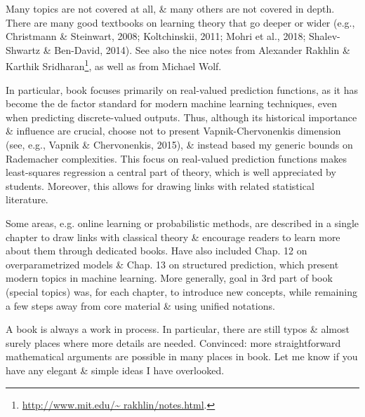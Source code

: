 \documentclass{article}
\begin{document}
\begin{enumerate}
	Many topics are not covered at all, \& many others are not covered in depth. There are many good textbooks on learning theory that go deeper or wider (e.g., Christmann \& Steinwart, 2008; Koltchinskii, 2011; Mohri et al., 2018; Shalev-Shwartz \& Ben-David, 2014). See also the nice notes from Alexander Rakhlin \& Karthik Sridharan\footnote{\url{http://www.mit.edu/~ rakhlin/notes.html}.}, as well as from Michael Wolf.
	
	In particular, book focuses primarily on real-valued prediction functions, as it has become the de factor standard for modern machine learning techniques, even when predicting discrete-valued outputs. Thus, although its historical importance \& influence are crucial, choose not to present Vapnik-Chervonenkis dimension (see, e.g., Vapnik \& Chervonenkis, 2015), \& instead based my generic bounds on Rademacher complexities. This focus on real-valued prediction functions makes least-squares regression a central part of theory, which is well appreciated by students. Moreover, this allows for drawing links with related statistical literature.
	
	Some areas, e.g. online learning or probabilistic methods, are described in a single chapter to draw links with classical theory \& encourage readers to learn more about them through dedicated books. Have also included Chap. 12 on overparametrized models \& Chap. 13 on structured prediction, which present modern topics in machine learning. More generally, goal in 3rd part of book (special topics) was, for each chapter, to introduce new concepts, while remaining a few steps away from core material \& using unified notations.
	
	A book is always a work in process. In particular, there are still typos \& almost surely places where more details are needed. Convinced: more straightforward mathematical arguments are possible in many places in book. Let me know if you have any elegant \& simple ideas I have overlooked.
	

\end{enumerate}
\end{document}

